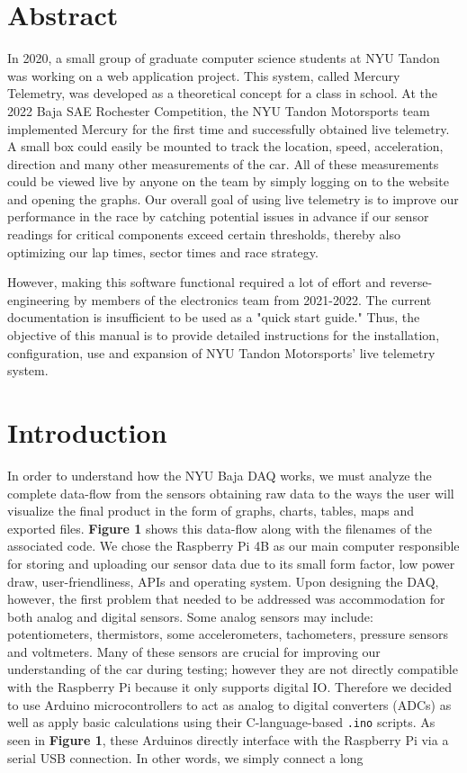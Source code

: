 \documentclass[12pt, letterpaper]{article}
\begin{document}
\newpage
\tableofcontents
\newpage
\section {Abstract}

In 2020, a small group of graduate computer science students at NYU Tandon was working on a web application project. This system, called Mercury Telemetry, was developed as a theoretical concept for a class in school. At the 2022 Baja SAE Rochester Competition, the NYU Tandon Motorsports team implemented Mercury for the first time and successfully obtained live telemetry. A small box could easily be mounted to track the location, speed, acceleration, direction and many other measurements of the car. All of these measurements could be viewed live by anyone on the team by simply logging on to the website and opening the graphs. Our overall goal of using live telemetry is to improve our performance in the race by catching potential issues in advance if our sensor readings for critical components exceed certain thresholds, thereby also optimizing our lap times, sector times and race strategy.\par However, making this software functional required a lot of effort and reverse-engineering by members of the electronics team from 2021-2022. The current documentation is insufficient to be used as a "quick start guide." Thus, the objective of this manual is to provide detailed instructions for the installation, configuration, use and expansion of NYU Tandon Motorsports' live telemetry system.
\section {Introduction}
In order to understand how the NYU Baja DAQ works, we must analyze the complete data-flow from the sensors obtaining raw data to the ways the user will visualize the final product in the form of graphs, charts, tables, maps and exported files. \textbf{Figure 1} shows this data-flow along with the filenames of the associated code. We chose the Raspberry Pi 4B as our main computer responsible for storing and uploading our sensor data due to its small form factor, low power draw, user-friendliness, APIs and operating system. Upon designing the DAQ, however, the first problem that needed to be addressed was accommodation for both analog and digital sensors. Some analog sensors may include: potentiometers, thermistors, some accelerometers, tachometers,  pressure sensors and voltmeters. Many of these sensors are crucial for improving our understanding of the car during testing; however they are not directly compatible with the Raspberry Pi because it only supports digital IO. Therefore we decided to use Arduino microcontrollers to act as analog to digital converters (ADCs) as well as apply basic calculations using their C-language-based \texttt{.ino} scripts. As seen in \textbf{Figure 1}, these Arduinos directly interface with the Raspberry Pi via a serial USB connection. In other words, we simply connect a long 
\end{document}
